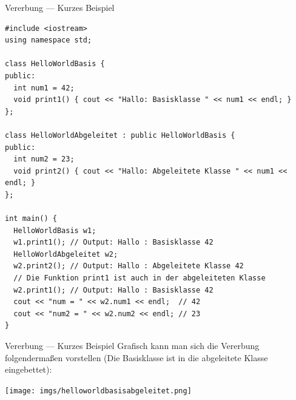 \documentclass[presentation]{beamer}
\begin{document}
\begin{frame}[label={sec:org3bf1c67},fragile]{Vererbung --- Kurzes Beispiel}
 \begin{verbatim}
#include <iostream>
using namespace std;

class HelloWorldBasis {
public:
  int num1 = 42;
  void print1() { cout << "Hallo: Basisklasse " << num1 << endl; }
};

class HelloWorldAbgeleitet : public HelloWorldBasis {
public:
  int num2 = 23;
  void print2() { cout << "Hallo: Abgeleitete Klasse " << num1 << endl; }
};

int main() {
  HelloWorldBasis w1;
  w1.print1(); // Output: Hallo : Basisklasse 42
  HelloWorldAbgeleitet w2;
  w2.print2(); // Output: Hallo : Abgeleitete Klasse 42
  // Die Funktion print1 ist auch in der abgeleiteten Klasse
  w2.print1(); // Output: Hallo : Basisklasse 42
  cout << "num = " << w2.num1 << endl;  // 42
  cout << "num2 = " << w2.num2 << endl; // 23
}
\end{verbatim}
\end{frame}
\begin{frame}[label={sec:org006f7d8}]{Vererbung --- Kurzes Beispiel}
Grafisch kann man sich die Vererbung folgendermaßen vorstellen (Die
Basisklasse ist in die abgeleitete Klasse eingebettet):
\begin{center}
\texttt{[image: imgs/helloworldbasisabgeleitet.png]}
\end{center}
\end{frame}
\end{document}
